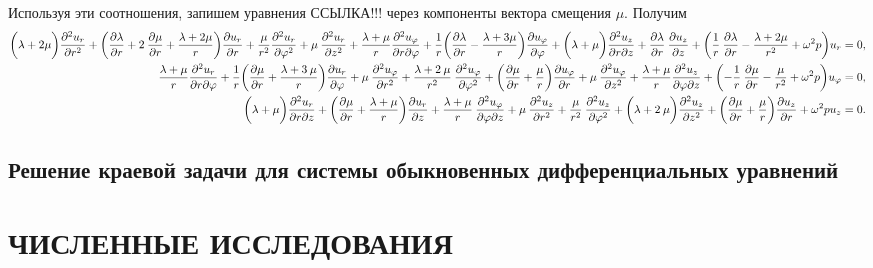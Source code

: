 Используя эти соотношения, запишем уравнения ССЫЛКА!!! через компоненты вектора смещения $\mu.$ Получим
\begin{equation}
\begin{aligned}
\biggl(\lambda+2\mu\biggr)\frac{\partial^2u_r}{\partial r^2}+\biggl(\frac{\partial\lambda}{\partial r}+2\:\frac{\partial\mu}{\partial r}+\frac{\lambda+2\mu}{r}\biggr)\frac{\partial u_r}{\partial r}+\frac{\mu}{r^2}\frac{\partial^2 u_r}{\partial \varphi^2}+\mu\:\frac{\partial^2 u_r}{\partial z^2}+\frac{\lambda+\mu}{r}\frac{\partial^2 u_{\varphi}}{\partial r\partial\varphi}+\frac{1}{r}\biggl(\frac{\partial\lambda}{\partial r}-\frac{\lambda+3\mu}{r}\biggr)\frac{\partial u_{\varphi}}{\partial\varphi}+\biggl(\lambda+\mu\biggr)\frac{\partial^2 u_z}{\partial r\partial z}+\frac{\partial\lambda}{\partial r}\:\frac{\partial u_z}{\partial z}+\biggl(\frac{1}{r}\:\frac{\partial\lambda}{\partial r}-\frac{\lambda+2\mu}{r^2}+\omega^2 p\biggr)u_r=0,\\
\frac{\lambda+\mu}{r}\frac{\partial^2u_r}{\partial r\partial\varphi}+\frac{1}{r}\biggl(\frac{\partial\mu}{\partial r}+\frac{\lambda+3\:\mu}{r}\biggr)\frac{\partial u_r}{\partial\varphi}+\mu\:\frac{\partial^2 u_{\varphi}}{\partial r^2}+\frac{\lambda+2\:\mu}{r^2}\:\frac{\partial^2 u_{\varphi}}{\partial \varphi^2}+\biggl(\frac{\partial\mu}{\partial r}+\frac{\mu}{r}\biggr)\frac{\partial u_{\varphi}}{\partial r}+\mu\:\frac{\partial^2 u_{\varphi}}{\partial z^2}+\frac{\lambda+\mu}{r}\frac{\partial^2 u_z}{\partial \varphi\partial z}+\biggl(-\frac{1}{r}\:\frac{\partial\mu}{\partial r}-\frac{\mu}{r^2}+\omega^2 p\biggr)u_{\varphi}=0,\\
\biggl(\lambda+\mu\biggr)\frac{\partial^2u_r}{\partial r\partial z}+\biggl(\frac{\partial\mu}{\partial r}+\frac{\lambda+\mu}{r}\biggr)\frac{\partial u_r}{\partial z}+\frac{\lambda+\mu}{r}\:\frac{\partial^2 u_{\varphi}}{\partial \varphi\partial z}+\mu\:\frac{\partial^2 u_z}{\partial r^2}+\frac{\mu}{r^2}\:\frac{\partial^2 u_z}{\partial {\varphi}^2}+\biggl(\lambda+2\:\mu\biggr)\frac{\partial^2 u_z}{\partial z^2}+\biggl(\frac{\partial\mu}{\partial r}+\frac{\mu}{r}\biggr)\frac{\partial u_z}{\partial r}+\omega^2 pu_z=0.
\end{aligned}
\end{equation}
\newpage
\subsection{Решение краевой задачи для системы обыкновенных дифференциальных уравнений}

\newpage
\section{ЧИСЛЕННЫЕ ИССЛЕДОВАНИЯ}

